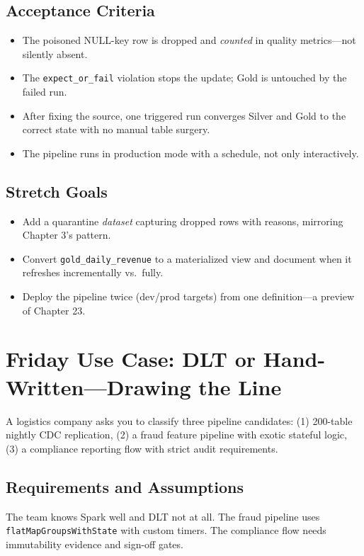 \subsection*{Acceptance Criteria}
\begin{itemize}
    \item The poisoned NULL-key row is dropped and \emph{counted} in quality metrics---not silently absent.
    \item The \texttt{expect\_or\_fail} violation stops the update; Gold is untouched by the failed run.
    \item After fixing the source, one triggered run converges Silver and Gold to the correct state with no manual table surgery.
    \item The pipeline runs in production mode with a schedule, not only interactively.
\end{itemize}

\subsection*{Stretch Goals}
\begin{itemize}
    \item Add a quarantine \emph{dataset} capturing dropped rows with reasons, mirroring Chapter 3's pattern.
    \item Convert \texttt{gold\_daily\_revenue} to a materialized view and document when it refreshes incrementally vs.\ fully.
    \item Deploy the pipeline twice (dev/prod targets) from one definition---a preview of Chapter 23.
\end{itemize}

\section{Friday Use Case: DLT or Hand-Written---Drawing the Line}
A logistics company asks you to classify three pipeline candidates: (1) 200-table nightly CDC replication, (2) a fraud feature pipeline with exotic stateful logic, (3) a compliance reporting flow with strict audit requirements.

\subsection{Requirements and Assumptions}
The team knows Spark well and DLT not at all. The fraud pipeline uses \texttt{flatMapGroupsWithState} with custom timers. The compliance flow needs immutability evidence and sign-off gates.

